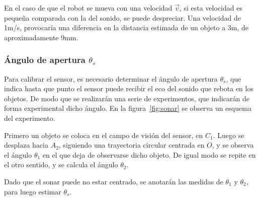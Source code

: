 \documentclass[10pt,a4paper,hidelinks,twocolumn]{article}
\begin{document}
En el caso de que el robot se mueva con una velocidad $\vec{v}$, si esta 
velocidad es pequeña comparada con la del sonido, se puede despreciar. Una 
velocidad de 1m/s, provocaría una diferencia en la distancia estimada de un 
objeto a 3m, de aproximadamente 9mm.

\subsubsection{Ángulo de apertura $\theta_{s}$}
Para calibrar el sensor, es necesario determinar el ángulo de apertura 
$\theta_{s}$, que indica hasta que punto el sensor puede recibir el eco del 
sonido que rebota en los objetos. De modo que se realizarán una serie de 
experimentos, que indicarán de forma experimental dicho ángulo. En la 
figura~\ref{fig:sonar} se observa un esquema del experimento.

Primero un objeto se coloca en el campo de visión del sensor, en $C_1$. Luego se 
desplaza hacia $A_2$, siguiendo una trayectoria circular centrada en $O$, y se 
observa el ángulo $\theta_1$ en el que deja de observarse dicho objeto. De igual 
modo se repite en el otro sentido, y se calcula el ángulo $\theta_{2}$.

Dado que el sonar puede no estar centrado, se anotarán las medidas de $\theta_1$
y $\theta_2$, para luego estimar $\theta_{s}$.
\end{document}
